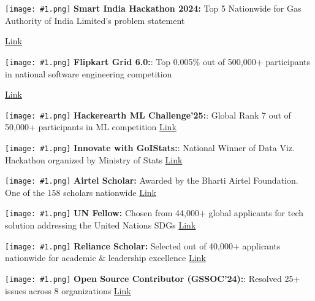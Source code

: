 \documentclass[a4paper]{article}
\newcommand{\bulletSep} { \vspace{1.5mm} }
\newcommand{\link}[2]{
    {\fontfamily{lmtt}\selectfont\href{#1}{#2}}
}
\newcommand{\image}[1]{
    \begingroup
    \normalfont
    \Large
    \texttt{[image: \#1.png]}%
    \endgroup
}
\begin{document}
\bulletSep
    \image{SIH} \textbf{Smart India Hackathon 2024:} Top 5 Nationwide for Gas Authority of India Limited’s problem statement\hfill 
\link{https://www.linkedin.com/posts/ranapratik_excited-to-share-that-our-team-status-200-activity-7306364851298217984-DSg1?utm_source=share&utm_medium=member_desktop&rcm=ACoAADBXcLYBo3NyHA3V4MuWErfYQBTEbWK9eEc}{Link}

\bulletSep
    \image{flipkart} \textbf{Flipkart Grid 6.0:}: Top 0.005\% out of 500,000+ participants in national software engineering competition\hfill 
    \link{https://unstop.com/certificate-preview/9cb473f6-16d7-4f80-8c5d-f1b3598ddb7f}{Link}

     \bulletSep
    \image{hackerearth} \textbf{Hackerearth ML Challenge'25:}: Global Rank 7 out of 50,000+ participants in ML competition \hfill \link{https://www.hackerearth.com/challenges/competitive/hackerearth-machine-learning-challenge-world-water-day/leaderboard/}{Link}

    \bulletSep
    \image{MOSPI} \textbf{Innovate with GoIStats:}: National Winner of Data Viz. Hackathon organized by Ministry of Stats \hfill \link{https://www.linkedin.com/posts/ministry-of-statistics-programme-implementation_hackathon-datafordevelopment-datavisualisation-activity-7345090514330804224-oimQ?utm_source=share&utm_medium=member_desktop&rcm=ACoAADBXcLYBo3NyHA3V4MuWErfYQBTEbWK9eEc}{Link}

\bulletSep
\image{airtel} \textbf{Airtel Scholar:} Awarded by the Bharti Airtel Foundation. One of the 158 scholars nationwide \hfill \link{https://bhartifoundation.org/bharti-airtel-scholarship/}{Link}

\bulletSep
\image{UN} \textbf{UN Fellow:} Chosen from 44,000+ global applicants for tech solution addressing the United Nations SDGs \hfill \link{https://www.millenniumfellows.org/fellow/2023/pu/pratik-rana}{Link}

\bulletSep
\image{rf} \textbf{Reliance Scholar:} Selected out of 40,000+ applicants nationwide for academic \& leadership excellence \hfill \link{https://www.scholarships.reliancefoundation.org/UG_Scholarship.aspx}{Link}



    

        

   

\bulletSep
    \image{GSSOC} \textbf{Open Source Contributor (GSSOC'24):}: Resolved 25+ issues across 8 organizations \hfill \link{https://gssoc.girlscript.tech/}{Link}
\end{document}
